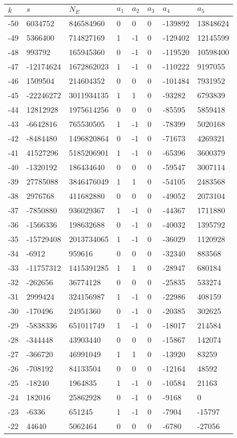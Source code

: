 \documentclass{amsart}
\begin{document}
\begin{longtable}{|l|l|l|lllll|}
\hline
$k$ & $s$ & $N_E$ & $a_1$ & $a_2$ & $a_3$ & $a_4$ & $a_5$\\
\hline
-50&6034752&846584960&0&0&0&-139892&13848624\\
-49&5366400&714827169&1&-1&0&-129402&12145599\\
-48&993792&165945360&0&-1&0&-119520&10598400\\
-47&-12174624&1672862023&1&-1&0&-110222&9197055\\
-46&1509504&214604352&0&0&0&-101484&7931952\\
-45&-22246272&3011934135&1&1&0&-93282&6793839\\
-44&12812928&1975614256&0&0&0&-85595&5859418\\
-43&-6642816&765530505&1&-1&0&-78399&5020168\\
-42&-8484480&1496820864&0&-1&0&-71673&4269321\\
-41&41527296&5185206901&1&-1&0&-65396&3600379\\
-40&-1320192&186434640&0&0&0&-59547&3007114\\
-39&27785088&3846476049&1&1&0&-54105&2483568\\
-38&2976768&411682880&0&0&0&-49052&2073104\\
-37&-7850880&936029367&1&-1&0&-44367&1711880\\
-36&-1566336&198632688&0&-1&0&-40032&1395792\\
-35&-15729408&2013734065&1&-1&0&-36029&1120928\\
-34&-6912&959616&0&0&0&-32340&883568\\
-33&-11757312&1415391285&1&1&0&-28947&680184\\
-32&-262656&36774128&0&0&0&-25835&533274\\
-31&2999424&324156987&1&-1&0&-22986&408159\\
-30&-170496&24951360&0&-1&0&-20385&302625\\
-29&-5838336&651011749&1&-1&0&-18017&214584\\
-28&-344448&43903440&0&0&0&-15867&142074\\
-27&-366720&46991049&1&1&0&-13920&83259\\
-26&-708192&84133504&0&0&0&-12164&48592\\
-25&-18240&1964835&1&-1&0&-10584&21163\\
-24&182016&25862928&0&-1&0&-9168&0\\
-23&-6336&651245&1&-1&0&-7904&-15797\\
-22&44640&5062464&0&0&0&-6780&-27056\\

\end{longtable}
\end{document}
